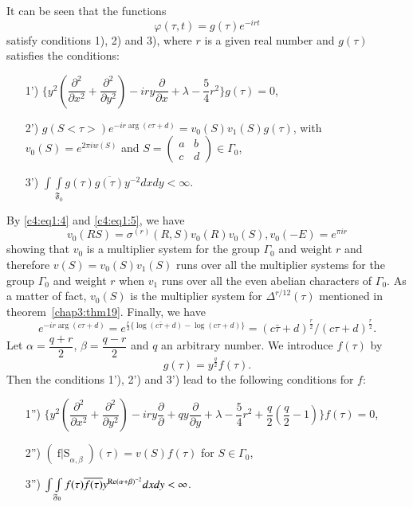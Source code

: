 It can be seen that the functions
$$
\varphi(\tau, t) = g(\tau)e^{-irt}
$$
satisfy conditions 1), 2) and 3), where $r$ is a given real number and
$g(\tau)$ satisfies the conditions:
\begin{itemize}
\item[1')] $\{y^2(\dfrac{\partial^2}{\partial x^2} +
  \dfrac{\partial^2}{\partial y^2}) - iry \dfrac{\partial}{\partial x} +
  \lambda - \dfrac{5}{4} r^2\} g(\tau)=0$,

\item[2')] $g(S<\tau>) e^{-ir \arg(c\tau+d)} = v_0(S)v_1(S)g(\tau)$,
  with $v_0(S)=e^{2\pi iw (S)}$ and $S =
  \left(\begin{smallmatrix} a&b\\c&d\end{smallmatrix}\right)
    \in \Gamma_0$,

\item[3')] $\int\int\limits_{\mathfrak{F}_0}g(\tau) \overline{g(\tau)}
  y^{-2} dx dy < \infty$.  
\end{itemize}
By \pageoriginale \eqref{c4:eq1:4} and \eqref{c4:eq1:5}, we have
$$
v_0(RS) = \sigma^{(r)} (R,S) v_0(R) v_0(S), v_0(-E) = e^{\pi ir}
$$
showing that $v_0$ is a multiplier system for the group $\Gamma_0$ and
weight $r$ and therefore $v(S)=v_0(S)v_1(S)$ runs over all the
multiplier systems for the group $\Gamma_0$ and weight $r$ when $v_1$
runs over all the even abelian characters of $\Gamma_0$. As a matter
of fact, $v_0(S)$ is the multiplier system for $\Delta^{r/12}(\tau)$
mentioned in theorem~\ref{chap3:thm19}. Finally, we have
$$
e^{-ir\arg(c\tau+d)} =
e^{\frac{r}{2}\{\log(c\bar{\tau}+d)-\log(c\tau+d)\}} =
(c\bar{\tau}+d)^{\frac{r}{2}} / (c\tau+d)^{\frac{r}{2}}.
$$
Let $\alpha=\dfrac{q+r}{2}$, $\beta=\dfrac{q-r}{2}$ and $q$ an
arbitrary number. We introduce $f(\tau)$ by 
$$
g(\tau) = y^{\frac{q}{2}} f(\tau).
$$
Then the conditions 1'), 2') and 3') lead to the following conditions
for $f$:
\begin{itemize}
\item[1'')] $\{y^2 (\dfrac{\partial^2}{\partial x^2} +
  \dfrac{\partial^2}{\partial y^2}) -iry \dfrac{\partial}{\partial} + qy
  \dfrac{\partial}{\partial y} + \lambda - \dfrac{5}{4} r^2 + \dfrac{q}{2}
  (\dfrac{q}{2}-1)\} f(\tau) =0$,

\item[2'')] $(\mathop{f|S}_{\alpha, \beta}) (\tau)= v(S) f(\tau)$ for
  $S\in \Gamma_0$, 

\item[3'')] $\int\int\limits_{\mathfrak{F}_0}f(\tau)
  \overline{f(\tau)} y^{\operatorname{Re}(\alpha+\beta)^{-2}} dx dy < \infty$. 
\end{itemize}
